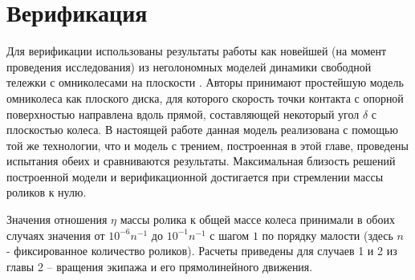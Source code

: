 
\section{Верификация}

Для верификации использованы результаты работы \cite{Borisov2011} как новейшей (на момент проведения исследования) из неголономных моделей динамики свободной тележки с омниколесами на плоскости \cite{Borisov2011, formalskii, ZobovaTatarinovPMM}. Авторы \cite{Borisov2011} принимают простейшую модель омниколеса как плоского диска, для которого скорость точки контакта с опорной поверхностью направлена вдоль прямой, составляющей некоторый угол $\delta$ с плоскостью колеса.
В настоящей работе данная модель реализована с помощью той же технологии, что и модель с трением, построенная в этой главе, проведены испытания обеих и сравниваются результаты.
Максимальная близость решений построенной модели и верификационной достигается при стремлении массы роликов к нулю.

Значения отношения $\eta$ массы ролика к общей массе колеса принимали в обоих случаях значения от $10^{-6}n^{-1}$ до $10^{-1}n^{-1}$ с шагом $1$ по порядку малости (здесь $n$ - фиксированное количество роликов).
Расчеты приведены для случаев 1 и 2 из главы 2 -- вращения экипажа и его прямолинейного движения.

